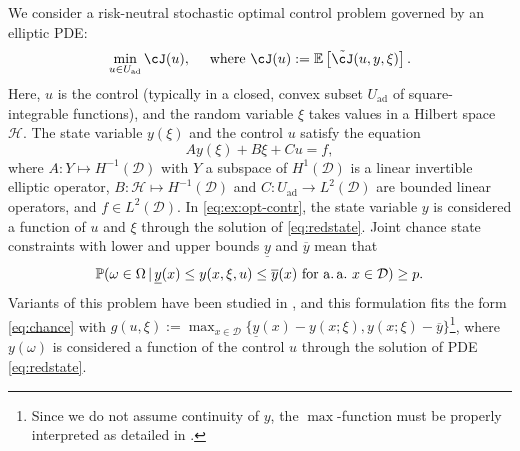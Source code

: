 \documentclass[%
onefignum,onetabnum]{siamonline250211}
\newcommand{\bs}{\mathbf s} \newcommand{\bt}{\mathbf t}
\newcommand{\D}{{\mathcal D}}
\begin{document}
\begin{example} \label{ex:optcont}
We consider a risk-neutral stochastic optimal control problem governed by an elliptic PDE:
\begin{equation}\label{eq:ex:opt-contr}
    \begin{aligned}
        \min_{u\in U_{\mathrm{ad}}} \cJ(u), \quad \text{ where } \cJ(u) := \mathbb E \left[\tilde\cJ(u,y,\xi)\right].   %
    \end{aligned}
\end{equation}
Here, $u$ is the control (typically in a closed, convex subset $U_\mathrm{ad}$ of square-integrable functions), and the random variable $\xi$ takes values
in a Hilbert space $\mathscr H$. The state variable $y(\xi)$ and the control $u$ satisfy the equation
\begin{equation}\label{eq:redstate}
A y(\xi) + B \xi + Cu  = f,
\end{equation}
where $A:Y\mapsto H^{-1}(\D)$ with $Y$ a subspace of $H^1(\D)$ is a linear invertible elliptic operator,
$B:\mathscr
H\mapsto H^{-1}(\D)$ and $C:U_{\!\text{ad}}\to L^2(\D)$ are bounded linear operators,
and $f\in L^2(\D)$. In \eqref{eq:ex:opt-contr}, the state variable $y$ is considered a function of $u$ and $\xi$ through the solution of \eqref{eq:redstate}.
Joint chance state constraints with lower and upper bounds $\underline y$ and $\overline y$ mean that
\begin{equation}\label{eq:chance}
  \mathbb P(\omega\in \Omega \,| \,\underline y(x) \le y(x, \xi,u)\le \overline y(x)
  \text{ for a.\,a.\ } x\in \D) \ge p.
\end{equation}
Variants of this problem have been studied in \cite{HeStWe-SIAM25,geiersbach2023optimality,geiersbach2025numerical,Kouri2023}, and this formulation fits the form \eqref{eq:chance} with $g(u,\xi) := \max_{x\in\D} \{\underline y(x) - y(x;\xi), y(x;\xi)-\overline y\}$\footnote{Since we do not assume continuity of $y$, the $\max$-function must be properly interpreted as detailed in \cite{HeStWe-SIAM25}.}, where $y(\omega)$ is considered a function of the control $u$ through the solution of PDE \eqref{eq:redstate}.
\end{example}
\end{document}
